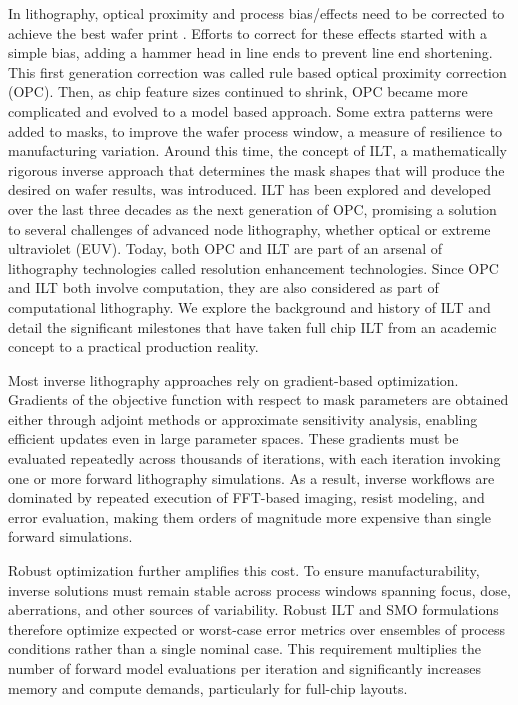 \documentclass[pdflatex,sn-mathphys-num]{sn-jnl}%
\theoremstyle{thmstyleone}%
\theoremstyle{thmstyletwo}%
\theoremstyle{thmstylethree}%
\begin{document}
In lithography, optical proximity and process bias/effects need to be corrected to achieve the best wafer print \cite{pang2021inverse}. 
Efforts to correct for these effects started with a simple bias, adding a hammer head in line ends to prevent line end shortening. 
This first generation correction was called rule based optical proximity correction (OPC). Then, as chip feature sizes continued to shrink, 
OPC became more complicated and evolved to a model based approach. Some extra patterns were added to masks, to improve the wafer process window,
a measure of resilience to manufacturing variation. Around this time, the concept of ILT, a mathematically rigorous
inverse approach that determines the mask shapes that will produce the desired on wafer results, was introduced. ILT has been explored and developed 
over the last three decades as the next generation of OPC, promising a solution to several challenges of advanced node lithography, whether optical or 
extreme ultraviolet (EUV). Today, both OPC and ILT are part of an arsenal of lithography technologies called resolution enhancement technologies. 
Since OPC and ILT both involve computation, they are also considered as part of computational lithography. We explore the background and history of 
ILT and detail the significant milestones that have taken full chip ILT from an academic concept to a practical production reality.

Most inverse lithography approaches rely on gradient-based optimization. Gradients of the objective function with respect to mask parameters are obtained either through adjoint methods or approximate sensitivity analysis, enabling efficient updates even in large parameter spaces. These gradients must be evaluated repeatedly across thousands of iterations, with each iteration invoking one or more forward lithography simulations. As a result, inverse workflows are dominated by repeated execution of FFT-based imaging, resist modeling, and error evaluation, making them orders of magnitude more expensive than single forward simulations.

Robust optimization further amplifies this cost. To ensure manufacturability, inverse solutions must remain stable across process windows spanning focus, dose, aberrations, and other sources of variability. Robust ILT and SMO formulations therefore optimize expected or worst-case error metrics over ensembles of process conditions rather than a single nominal case. This requirement multiplies the number of forward model evaluations per iteration and significantly increases memory and compute demands, particularly for full-chip layouts.
\end{document}
